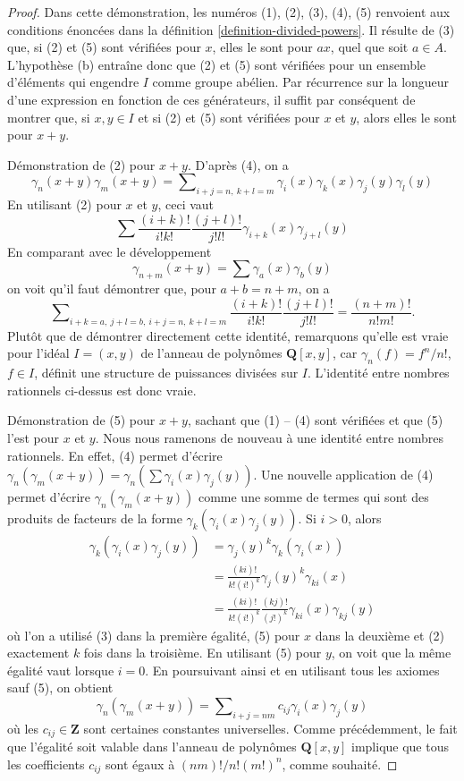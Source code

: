 \begin{proof}
Dans cette démonstration, les numéros (1), (2), (3), (4), (5) renvoient aux
conditions énoncées dans la définition \ref{definition-divided-powers}. Il
résulte de (3) que, si (2) et (5) sont vérifiées pour $x$, elles le
sont pour $ax$, quel que soit $a \in A$. L'hypothèse (b) entraîne donc que (2)
et (5) sont vérifiées pour un ensemble d'éléments qui
engendre $I$ comme groupe abélien. Par récurrence sur la longueur d'une
expression en fonction de ces générateurs, il suffit par conséquent de montrer que, si
$x, y \in I$ et si (2) et (5) sont vérifiées pour $x$ et $y$, alors elles le sont
pour $x + y$.

\medskip\noindent
Démonstration de (2) pour $x + y$. D'après (4), on a
$$
\gamma_n(x + y)\gamma_m(x + y) =
\sum\nolimits_{i + j = n,\ k + l = m}
\gamma_i(x)\gamma_k(x)\gamma_j(y)\gamma_l(y)
$$
En utilisant (2) pour $x$ et $y$, ceci vaut
$$
\sum\frac{(i + k)!}{i!k!}\frac{(j + l)!}{j!l!}
\gamma_{i + k}(x)\gamma_{j + l}(y)
$$
En comparant avec le développement
$$
\gamma_{n + m}(x + y) = \sum\gamma_a(x)\gamma_b(y)
$$
on voit qu'il faut démontrer que, pour $a + b = n + m$, on a
$$
\sum\nolimits_{i + k = a,\ j + l = b,\ i + j = n,\ k + l = m}
\frac{(i + k)!}{i!k!}\frac{(j + l)!}{j!l!}
=
\frac{(n + m)!}{n!m!}.
$$
Plutôt que de démontrer directement cette identité, remarquons qu'elle est
vraie pour l'idéal $I = (x, y)$ de l'anneau de polynômes $\mathbf{Q}[x, y]$,
car $\gamma_n(f) = f^n/n!$, $f \in I$, définit une structure de
puissances divisées sur $I$. L'identité entre nombres rationnels ci-dessus est donc vraie.

\medskip\noindent
Démonstration de (5) pour $x + y$, sachant que (1) -- (4) sont vérifiées et que
(5) l'est pour $x$ et $y$. Nous nous ramenons de nouveau à une identité
entre nombres rationnels. En effet, (4) permet d'écrire
$\gamma_n(\gamma_m(x + y)) = \gamma_n(\sum\gamma_i(x)\gamma_j(y))$.
Une nouvelle application de (4) permet d'écrire
$\gamma_n(\gamma_m(x + y))$ comme une somme de termes qui sont des produits
de facteurs de la forme $\gamma_k(\gamma_i(x)\gamma_j(y))$.
Si $i > 0$, alors
\begin{align*}
\gamma_k(\gamma_i(x)\gamma_j(y)) & =
\gamma_j(y)^k\gamma_k(\gamma_i(x)) \\
& = \frac{(ki)!}{k!(i!)^k} \gamma_j(y)^k \gamma_{ki}(x) \\
& =
\frac{(ki)!}{k!(i!)^k} \frac{(kj)!}{(j!)^k} \gamma_{ki}(x) \gamma_{kj}(y)
\end{align*}
où l'on a utilisé (3) dans la première égalité, (5) pour $x$ dans la deuxième et
(2) exactement $k$ fois dans la troisième. En utilisant (5) pour $y$, on voit
que la même égalité vaut lorsque $i = 0$. En poursuivant ainsi et en
utilisant tous les axiomes sauf (5), on obtient
$$
\gamma_n(\gamma_m(x + y)) =
\sum\nolimits_{i + j = nm} c_{ij}\gamma_i(x)\gamma_j(y)
$$
où les $c_{ij} \in\mathbf{Z}$ sont certaines constantes
universelles. Comme précédemment, le fait que l'égalité soit valable dans l'anneau de polynômes $\mathbf{Q}[x, y]$
implique que tous les coefficients $c_{ij}$ sont égaux à $(nm)!/n!(m!)^n$,
comme souhaité.
\end{proof}

